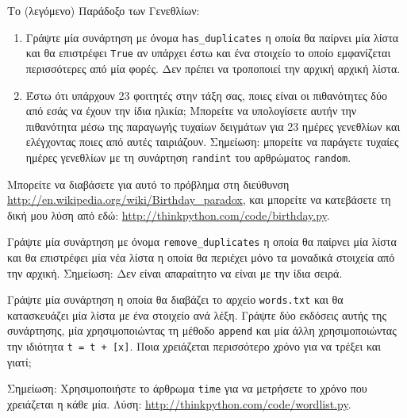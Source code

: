 \documentclass[10pt]{book}
\begin{document}
\begin{exercise}
\label{duplicate}

Το (λεγόμενο) Παράδοξο των Γενεθλίων:

\begin{enumerate}

\item  Γράψτε μία συνάρτηση με όνομα \verb"has_duplicates" η οποία θα παίρνει μία λίστα και θα επιστρέφει {\tt True} αν υπάρχει έστω και ένα στοιχείο το οποίο εμφανίζεται περισσότερες από μία φορές. Δεν πρέπει να τροποποιεί την αρχική αρχική λίστα.

\item  Έστω ότι υπάρχουν 23 φοιτητές στην τάξη σας, ποιες είναι οι πιθανότητες δύο από εσάς να έχουν την ίδια ηλικία; Μπορείτε να υπολογίσετε αυτήν την πιθανότητα μέσω της παραγωγής τυχαίων δειγμάτων για 23 ημέρες γενεθλίων και ελέγχοντας ποιες από αυτές ταιριάζουν. Σημείωση: μπορείτε να παράγετε τυχαίες ημέρες γενεθλίων με τη συνάρτηση {\tt randint} του αρθρώματος {\tt random}.

\end{enumerate}

Μπορείτε να διαβάσετε για αυτό το πρόβλημα στη διεύθυνση \url{http://en.wikipedia.org/wiki/Birthday_paradox}, και μπορείτε να κατεβάσετε τη δική μου λύση από εδώ: \url{http://thinkpython.com/code/birthday.py}.
\\
\end{exercise}


\begin{exercise}

Γράψτε μία συνάρτηση με όνομα \verb"remove_duplicates" η οποία θα παίρνει μία λίστα και θα επιστρέφει μία νέα λίστα η οποία θα περιέχει μόνο τα μοναδικά στοιχεία από την αρχική. Σημείωση: Δεν είναι απαραίτητο να είναι με την ίδια σειρά.
\\
\end{exercise}


\begin{exercise}

Γράψτε μία συνάρτηση η οποία θα διαβάζει το αρχείο {\tt words.txt} και θα κατασκευάζει μία λίστα με ένα στοιχείο ανά λέξη. Γράψτε δύο εκδόσεις αυτής της συνάρτησης, μία χρησιμοποιώντας τη μέθοδο {\tt append} και μία άλλη χρησιμοποιώντας την ιδιότητα {\tt t = t + [x]}. Ποια χρειάζεται περισσότερο χρόνο για να τρέξει και γιατί;

Σημείωση: Χρησιμοποιήστε το άρθρωμα {\tt time} για να μετρήσετε το χρόνο που χρειάζεται η κάθε μία. Λύση: \url{http://thinkpython.com/code/wordlist.py}.
\\

\end{exercise}
\end{document}
